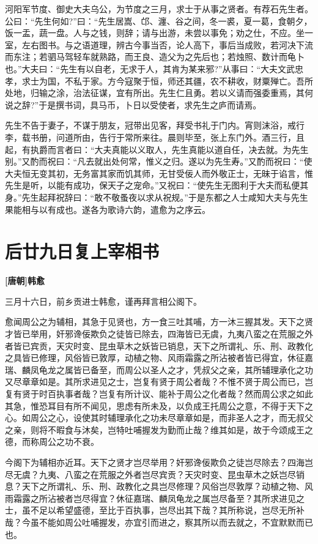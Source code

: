 \documentclass[UTF8,titlepage,oneside]{ctexbook}
\begin{document}
河阳军节度、御史大夫乌公，为节度之三月，求士于从事之贤者。有荐石先生者。公曰：“先生何如?”曰：“先生居嵩、邙、瀍、谷之间，冬一裘，夏一葛，食朝夕，饭一盂，蔬一盘。人与之钱，则辞；请与出游，未尝以事免；劝之仕，不应。坐一室，左右图书。与之语道理，辨古今事当否，论人高下，事后当成败，若河决下流而东注；若驷马驾轻车就熟路，而王良、造父为之先后也；若烛照、数计而龟卜也。”大夫曰：“先生有以自老，无求于人，其肯为某来邪?”从事曰：“大夫文武忠孝，求士为国，不私于家。方今寇聚于恒，师还其疆，农不耕收，财粟殚亡。吾所处地，归输之涂，治法征谋，宜有所出。先生仁且勇。若以义请而强委重焉，其何说之辞?”于是撰书词，具马币，卜日以受使者，求先生之庐而请焉。

先生不告于妻子，不谋于朋友，冠带出见客，拜受书礼于门内。宵则沫浴，戒行李，载书册，问道所由，告行于常所来往。晨则毕至，张上东门外。酒三行，且起，有执爵而言者曰：“大夫真能以义取人，先生真能以道自任，决去就。为先生别。”又酌而祝曰：“凡去就出处何常，惟义之归。遂以为先生寿。”又酌而祝曰：“使大夫恒无变其初，无务富其家而饥其师，无甘受佞人而外敬正士，无昧于谄言，惟先生是听，以能有成功，保天子之宠命。”又祝曰：“使先生无图利于大夫而私便其身。”先生起拜祝辞曰：“敢不敬蚤夜以求从祝规。”于是东都之人士咸知大夫与先生果能相与以有成也。遂各为歌诗六韵，遣愈为之序云。


\chapter*{后廿九日复上宰相书}
\begin{center}
	\textbf{[唐朝]韩愈}
\end{center}

三月十六日，前乡贡进士韩愈，谨再拜言相公阁下。

愈闻周公之为辅相，其急于见贤也，方一食三吐其哺，方一沐三握其发。天下之贤才皆已举用，奸邪谗佞欺负之徒皆已除去，四海皆已无虞，九夷八蛮之在荒服之外者皆已宾贡，天灾时变、昆虫草木之妖皆已销息，天下之所谓礼、乐、刑、政教化之具皆已修理，风俗皆已敦厚，动植之物、风雨霜露之所沾被者皆已得宜，休征嘉瑞、麟凤龟龙之属皆已备至，而周公以圣人之才，凭叔父之亲，其所辅理承化之功又尽章章如是。其所求进见之士，岂复有贤于周公者哉？不惟不贤于周公而已，岂复有贤于时百执事者哉？岂复有所计议、能补于周公之化者哉？然而周公求之如此其急，惟恐耳目有所不闻见，思虑有所未及，以负成王托周公之意，不得于天下之心。如周公之心，设使其时辅理承化之功未尽章章如是，而非圣人之才，而无叔父之亲，则将不暇食与沐矣，岂特吐哺握发为勤而止哉？维其如是，故于今颂成王之德，而称周公之功不衰。

今阁下为辅相亦近耳。天下之贤才岂尽举用？奸邪谗佞欺负之徒岂尽除去？四海岂尽无虞？九夷、八蛮之在荒服之外者岂尽宾贡？天灾时变、昆虫草木之妖岂尽销息？天下之所谓礼、乐、刑、政教化之具岂尽修理？风俗岂尽敦厚？动植之物、风雨霜露之所沾被者岂尽得宜？休征嘉瑞、麟凤龟龙之属岂尽备至？其所求进见之士，虽不足以希望盛德，至比于百执事，岂尽出其下哉？其所称说，岂尽无所补哉？今虽不能如周公吐哺握发，亦宜引而进之，察其所以而去就之，不宜默默而已也。
\end{document}
